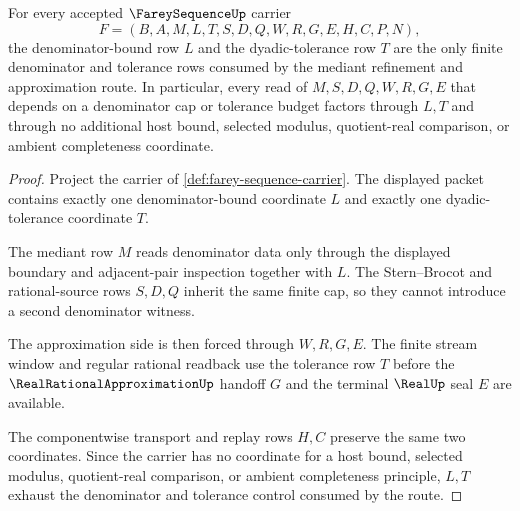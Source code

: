 \begin{theorem}
\label{thm:farey-sequence-denominator-tolerance-control}
For every accepted $\FareySequenceUp$ carrier
$$
F=(B,A,M,L,T,S,D,Q,W,R,G,E,H,C,P,N),
$$
the denominator-bound row $L$ and the dyadic-tolerance row $T$ are the only finite denominator and tolerance rows consumed by the mediant refinement and approximation route. In particular, every read of $M,S,D,Q,W,R,G,E$ that depends on a denominator cap or tolerance budget factors through $L,T$ and through no additional host bound, selected modulus, quotient-real comparison, or ambient completeness coordinate.
\end{theorem}
\begin{proof}
Project the carrier of \autoref{def:farey-sequence-carrier}. The displayed packet contains exactly one denominator-bound coordinate $L$ and exactly one dyadic-tolerance coordinate $T$.

The mediant row $M$ reads denominator data only through the displayed boundary and adjacent-pair inspection together with $L$. The Stern--Brocot and rational-source rows $S,D,Q$ inherit the same finite cap, so they cannot introduce a second denominator witness.

The approximation side is then forced through $W,R,G,E$. The finite stream window and regular rational readback use the tolerance row $T$ before the $\RealRationalApproximationUp$ handoff $G$ and the terminal $\RealUp$ seal $E$ are available.

The componentwise transport and replay rows $H,C$ preserve the same two coordinates. Since the carrier has no coordinate for a host bound, selected modulus, quotient-real comparison, or ambient completeness principle, $L,T$ exhaust the denominator and tolerance control consumed by the route.
\end{proof}

